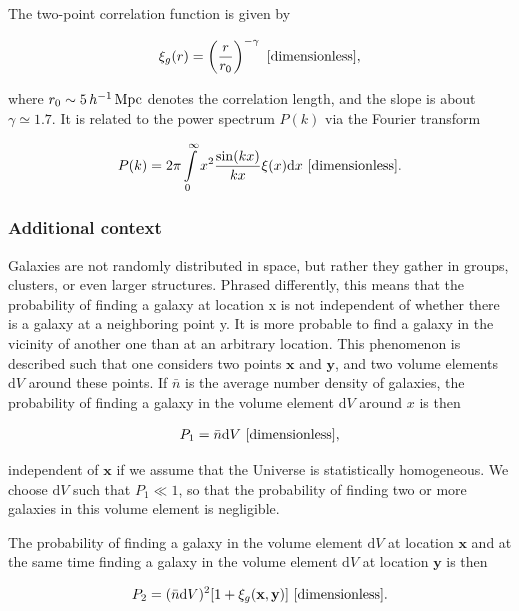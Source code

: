 \documentclass[a4paper,11pt]{article}
\begin{document}
The two-point correlation function is given by

\begin{align*}
    \xi_g(r) = \left(\frac{r}{r_0}\right)^{-\gamma} ~ [{\rm dimensionless}],
\end{align*}

{\noindent}where $r_0\sim5\,h^{-1}\,{\rm Mpc}$ denotes the correlation length, and the slope is about $\gamma\simeq1.7$. It is related to the power spectrum $P(k)$ via the Fourier transform

\begin{align*}
    P(k) = 2\pi \int\limits_0^\infty x^2\frac{\sin(kx)}{kx}\xi(x)\mathrm{d}x ~ [{\rm dimensionless}].
\end{align*}

\subsubsection{Additional context}

Galaxies are not randomly distributed in space, but rather they gather in groups, clusters, or even larger structures. Phrased differently, this means that the probability of finding a galaxy at location x is not independent of whether there is a galaxy at a neighboring point y. It is more probable to find a galaxy in the vicinity of another one than at an arbitrary location. This phenomenon is described such that one considers two points $\mathbf{x}$ and $\mathbf{y}$, and two volume elements $\mathrm{d}V$ around these points. If $\bar{n}$ is the average number density of galaxies, the probability of finding a galaxy in the volume element $\mathrm{d}V$ around $x$ is then

\begin{align*}
    P_1 = \bar{n}\mathrm{d}V ~ [{\rm dimensionless}],
\end{align*}

{\noindent}independent of $\mathbf{x}$ if we assume that the Universe is statistically homogeneous. We choose $\mathrm{d}V$ such that $P_1\ll1$, so that the probability of finding two or more galaxies in this volume element is negligible.

{\noindent}The probability of finding a galaxy in the volume element $\mathrm{d}V$ at location $\mathbf{x}$ and at the same time finding a galaxy in the volume element $\mathrm{d}V$ at location $\mathbf{y}$ is then

\begin{align*}
    P_2 = (\bar{n}\mathrm{d}V)^2 [1+\xi_g(\mathbf{x},\mathbf{y})] ~ [{\rm dimensionless}].
\end{align*}
\end{document}
